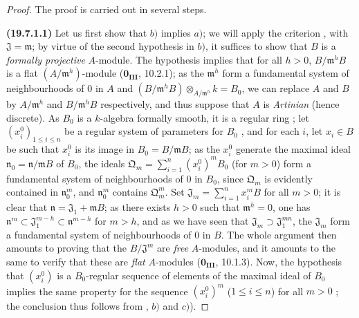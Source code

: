 \begin{proof}
The proof is carried out in several steps.

\medskip
\noindent{}\label{0.19.7.1.1}\textbf{(19.7.1.1)}\enspace
Let us first show that $b)$ implies $a)$; we will apply the criterion , with $\mathfrak{J}=\mathfrak{m}$; by virtue of the second hypothesis in $b)$, it suffices to show that $B$ is a \emph{formally projective} $A$-module.
The hypothesis implies that for all $h>0$, $B/\mathfrak{m}^h B$ is a flat $(A/\mathfrak{m}^h)$-module ($\mathbf{0_{III}}$, 10.2.1); as the $\mathfrak{m}^h$ form a fundamental system of neighbourhoods of $0$ in $A$ and $(B/\mathfrak{m}^h B)\otimes_{A/\mathfrak{m}^h} k = B_0$, we can replace $A$ and $B$ by $A/\mathfrak{m}^h$ and $B/\mathfrak{m}^h B$ respectively, and thus suppose that $A$ is \emph{Artinian} (hence discrete).
As $B_0$ is a $k$-algebra formally smooth, it is a regular ring ; let $(x_i^0)_{1\leq i\leq n}$ be a regular system of parameters for $B_0$ ,
and for each $i$, let $x_i\in B$ be such that $x_i^0$ is its image in $B_0=B/\mathfrak{m}B$; as the $x_i^0$ generate the maximal ideal $\mathfrak{n}_0=\mathfrak{n}/\mathfrak{m}B$ of $B_0$, the ideals $\mathfrak{Q}_m=\sum_{i=1}^n (x_i^0)^m B_0$ (for $m>0$) form a fundamental system of neighbourhoods of $0$ in $B_0$, since $\mathfrak{Q}_m$ is evidently contained in $\mathfrak{n}_0^m$, and $\mathfrak{n}_0^m$ contains $\mathfrak{Q}_m^m$.
Set $\mathfrak{J}_m=\sum_{i=1}^n x_i^m B$ for all $m>0$;
it is clear that $\mathfrak{n}=\mathfrak{J}_1+\mathfrak{m}B$; as there exists $h>0$ such that $\mathfrak{m}^h=0$, one has $\mathfrak{n}^m\subset\mathfrak{J}_1^{m-h}\subset\mathfrak{n}^{m-h}$ for $m>h$, and as we have seen that $\mathfrak{J}_m\supset\mathfrak{J}_1^{mn}$, the $\mathfrak{J}_m$ form a fundamental system of neighbourhoods of $0$ in $B$.
The whole argument then amounts to proving that the $B/\mathfrak{J}^m$ are \emph{free} $A$-modules, and it amounts to the same to verify that these are \emph{flat} $A$-modules ($\mathbf{0_{III}}$, 10.1.3).
Now, the hypothesis that $(x_i^0)$ is a $B_0$-regular sequence of elements of the maximal ideal of $B_0$ implies the same property for the sequence $(x_i^0)^m$ ($1\leq i\leq n$) for all $m>0$ ; the conclusion thus follows from , $b)$ and $c)$).
\end{proof}

